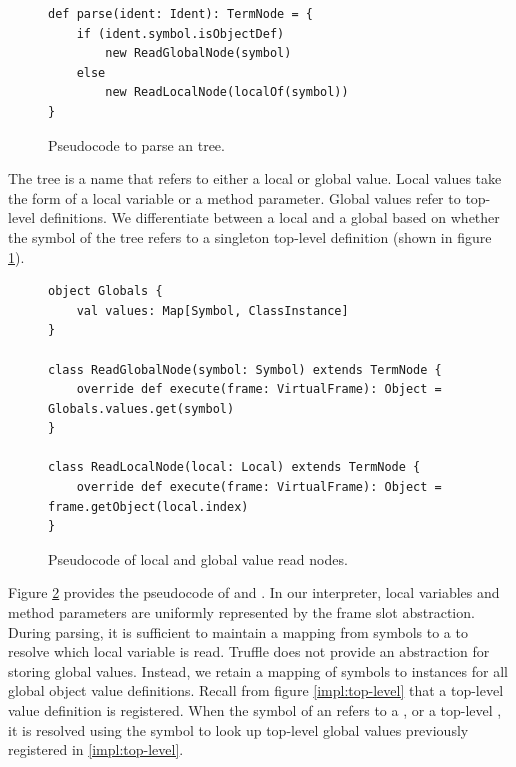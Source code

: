 \begin{figure}[!htb]
\begin{verbatim}
def parse(ident: Ident): TermNode = {
	if (ident.symbol.isObjectDef)
		new ReadGlobalNode(symbol)
	else 
		new ReadLocalNode(localOf(symbol))
}
\end{verbatim}
\caption{Pseudocode to parse an  tree.}
\label{impl:parse-ident}
\end{figure}

The  tree is a name that refers to either a local or global value.
Local values take the form of a local variable or a method parameter.
Global values refer to top-level  definitions.
We differentiate between a local and a global based on whether the symbol of the  tree refers to a singleton top-level  definition (shown in figure \ref{impl:parse-ident}).

\begin{figure}[!htb]
\begin{verbatim}
object Globals {
	val values: Map[Symbol, ClassInstance]
}

class ReadGlobalNode(symbol: Symbol) extends TermNode {
	override def execute(frame: VirtualFrame): Object = Globals.values.get(symbol)
}

class ReadLocalNode(local: Local) extends TermNode {
	override def execute(frame: VirtualFrame): Object = frame.getObject(local.index)
}
\end{verbatim}
\caption{Pseudocode of local and global value read nodes.}
\label{impl:local-global-node}
\end{figure}

Figure \ref{impl:local-global-node} provides the pseudocode of  and .
In our interpreter, local variables and method parameters are uniformly represented by the frame slot abstraction.
During parsing, it is sufficient to maintain a mapping from symbols to a  to resolve which local variable is read.
Truffle does not provide an abstraction for storing global values.
Instead, we retain a mapping of symbols to instances for all global object value definitions.
Recall from figure \ref{impl:top-level} that a top-level value definition is registered.
When the symbol of an  refers to a , or a top-level , it is resolved using the symbol to look up top-level global values previously registered in \ref{impl:top-level}.


